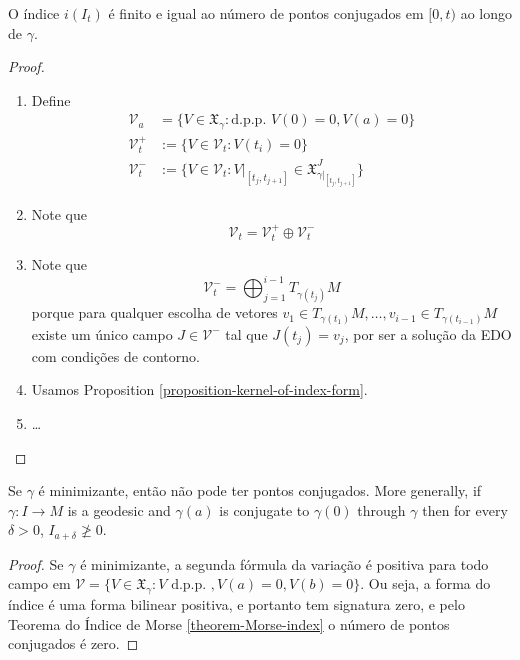 \begin{theorem}
\label{theorem-morse-index}
O índice $i(I_t)$ é finito e igual ao número de pontos conjugados em $[0,t)$ ao
longo de $\gamma$.
\end{theorem}

\begin{proof}
\begin{enumerate}
\item Define
\begin{align*}
\mathcal{V}_a&=\{V \in \mathfrak{X}_\gamma:\text{d.p.p. }V(0)=0, V(a)=0\}\\
\mathcal{V}_t^+&:=\{V \in \mathcal{V}_t:V(t_i)=0\}\\
\mathcal{V}_t^-& :=\{V \in \mathcal{V}_t:V|_{[t_j,t_{j+1}]}\in
\mathfrak{X}_{\gamma|_{[t_j,t_{j+1}]}}^J\}
\end{align*}
\item Note que
$$
\mathcal{V}_t=\mathcal{V}_t^+ \oplus  \mathcal{V}_t^-
$$
\item Note que 
$$
\mathcal{V}_t^-=\bigoplus_{j=1}^{i-1}T_{\gamma(t_j)}M
$$
porque para qualquer escolha de vetores
 $v_1 \in T_{\gamma(t_1)}M,\ldots,v_{i-1}\in T_{\gamma(t_{i-1})}M$ existe
 um único campo $J \in \mathcal{V}^-$ tal que $J(t_j)=v_j$, por ser a solução
 da EDO com condições de contorno.
\item Usamos Proposition \ref{proposition-kernel-of-index-form}.
\item …
\end{enumerate}
\end{proof}



\begin{theorem}
\label{theorem-Jacobi-theorem}
Se $\gamma$ é minimizante, então não pode ter pontos conjugados. More generally,
if $\gamma:I \to M$ is a geodesic and $ \gamma(a)$ is conjugate to $\gamma(0)$
through $\gamma$ then for every $\delta>0$, $I_{a+\delta}\not \geq 0$.
\end{theorem}

\begin{proof}
Se $\gamma$ é minimizante, a segunda fórmula da variação é positiva para todo
campo em $\mathcal{V}=\{V\in \mathfrak{X}_\gamma:V \text{ d.p.p. },
V(a)=0,V(b)=0\}$. Ou seja, a forma do índice é uma forma bilinear positiva, e
portanto tem signatura zero, e pelo Teorema do Índice de Morse 
\ref{theorem-Morse-index} o número de pontos conjugados é zero.
\end{proof}

